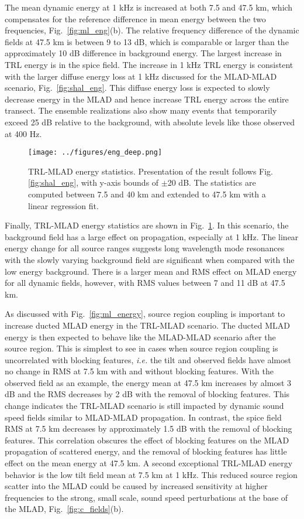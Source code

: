 \documentclass[preprint,NumberedRefs]{JASA}
\begin{document}
The mean dynamic energy at 1 kHz is increased at both 7.5 and 47.5 km, which compensates for the reference difference in mean energy between the two frequencies, Fig.~\ref{fig:ml_eng}(b). The relative frequency difference of the dynamic fields at 47.5 km is between 9 to 13 dB, which is comparable or larger than the approximately 10 dB difference in background energy. The largest increase in TRL energy is in the spice field. The increase in 1 kHz TRL energy is consistent with the larger diffuse energy loss at 1 kHz discussed for the MLAD-MLAD scenario, Fig.~\ref{fig:shal_eng}. This diffuse energy loss is expected to slowly decrease energy in the MLAD and hence increase TRL energy across the entire transect. The ensemble realizations also show many events that temporarily exceed 25 dB relative to the background, with absolute levels like those observed at 400 Hz.

\begin{figure}
\texttt{[image: ../figures/eng\_deep.png]}
    \caption{TRL-MLAD energy statistics. Presentation of the result follows Fig. \ref{fig:shal_eng}, with y-axis bounds of $\pm$20 dB. The statistics are computed between 7.5 and 40 km and extended to 47.5 km with a linear regression fit.}
    \label{fig:deep_eng}
\end{figure}
Finally, TRL-MLAD energy statistics are shown in Fig.~\ref{fig:deep_eng}. In this scenario, the background field has a large effect on propagation, especially at 1 kHz. The linear energy change for all source ranges suggests long wavelength mode resonances with the slowly varying background field\cite{colosi21} are significant when compared with the low energy background. There is a larger mean and RMS effect on MLAD energy for all dynamic fields, however, with RMS values between 7 and 11 dB at 47.5 km.

As discussed with Fig.~\ref{fig:ml_energy}, source region coupling is important to increase ducted MLAD energy in the TRL-MLAD scenario. The ducted MLAD energy is then expected to behave like the MLAD-MLAD scenario after the source region. This is simplest to see in cases when source region coupling is uncorrelated with blocking features, \emph{i.e.} the tilt and observed fields have almost no change in RMS at 7.5 km with and without blocking features. With the observed field as an example, the energy mean at 47.5 km increases by almost 3 dB and the RMS decreases by 2 dB with the removal of blocking features. This change indicates the TRL-MLAD scenario is still impacted by dynamic sound speed fields similar to MLAD-MLAD propagation. In contrast, the spice field RMS at 7.5 km decreases by approximately 1.5 dB with the removal of blocking features. This correlation obscures the effect of blocking features on the MLAD propagation of scattered energy, and the removal of blocking features has little effect on the mean energy at 47.5 km. A second exceptional TRL-MLAD energy behavior is the low tilt field mean at 7.5 km at 1 kHz. This reduced source region scatter into the MLAD could be caused by increased sensitivity at higher frequencies to the strong, small scale, sound speed perturbations at the base of the MLAD, Fig.~\ref{fig:c_fields}(b).
\end{document}
